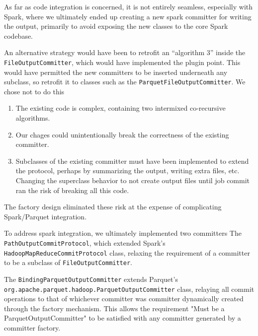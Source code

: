 \documentclass[conference]{IEEEtran}
\begin{document}
As far as code integration is concerned, it is not entirely seamless, especially
with Spark, where we ultimately ended up creating a new spark committer for
writing the output, primarily to avoid exposing the new classes to the core
Spark codebase.

An alternative strategy would have been to retrofit an ``algorithm 3'' inside
the \texttt{FileOutputCommitter}, which would have implemented the plugin point.
This would have permitted the new committers to be inserted underneath any
subclass, so retrofit it to classes such as the \texttt{ParquetFileOutputCommitter}.
We chose not to do this

\begin{enumerate}
  \item The existing code is complex, containing two intermixed co-recursive
  algorithms.
  \item Our chages could unintentionally break the correctness of the existing committer.
  \item Subclasses of the existing committer must have been implemented to extend
  the protocol, perhaps by summarizing the output, writing extra files, etc.
  Changing the superclass behavior to not create output files until job commit
  ran the risk of breaking all this code.
\end{enumerate}

The factory design eliminated these risk at the expense of complicating
Spark/Parquet integration.

To address spark integration, we ultimately implemented two committers
The \texttt{PathOutputCommitProtocol}, which extended Spark's
\texttt{HadoopMapReduceCommitProtocol} class, relaxing the requirement of a
committer to be a subclass of \texttt{FileOutputCommitter}.

The \texttt{BindingParquetOutputCommitter} extends Parquet's
\texttt{org.apache.parquet.hadoop.ParquetOutputCommitter} class, relaying
all commit operations to that of whichever committer was committer dynamically created
through the factory mechanism.
This allows the requirement "Must be a ParquetOutputCommitter" to be satisfied
with any committer generated by a committer factory.
\end{document}
